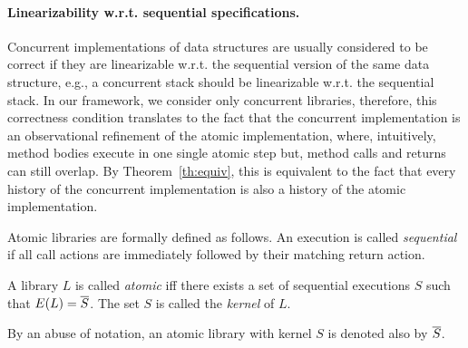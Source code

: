 
\paragraph{Linearizability w.r.t. sequential specifications.}
Concurrent implementations of data structures are usually considered to be
correct if they are linearizable w.r.t. the sequential version of the same data
structure, e.g., a concurrent stack should be linearizable w.r.t. the
sequential stack. In our framework, we consider only concurrent libraries,
therefore, this correctness condition translates to the fact that the
concurrent implementation is an observational refinement of the atomic
implementation, where, intuitively, method bodies execute in one single atomic
step but, method calls and returns can still overlap. By Theorem~\ref{th:equiv}, this is equivalent
to the fact that every history of the concurrent implementation is also a history of the
atomic implementation.

Atomic libraries are formally defined as follows.  
An execution is called 
\emph{sequential} if all call actions are immediately followed by their matching 
return action. %

\begin{definition}

A library $L$ is called \emph{atomic} iff there exists a set of sequential executions $S$ such that 
$E(L)=\overline{{S}}$. The set $S$ is called the \emph{kernel} of $L$.

\end{definition}
By an abuse of notation, an atomic library with kernel $S$ is denoted also by $\overline{{S}}$.

\begin{example}


\end{example}


